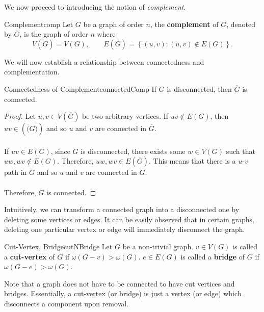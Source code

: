 \documentclass[math]{amznotes}
\theoremstyle{remark}
\begin{document}
We now proceed to introducing the notion of \textit{complement}.
\begin{dfnbox}{Complement}{comp}
    Let $G$ be a graph of order $n$, the {\color{red} \textbf{complement}} of $G$, denoted by $\overline{G}$, is the graph of order $n$ where
    \begin{equation*}
        V\left(\overline{G}\right) = V(G), \qquad E\left(\overline{G}\right) = \left\{(u, v) \colon (u, v) \notin E(G)\right\}.
    \end{equation*}
\end{dfnbox}
We will now establish a relationship between connectedness and complementation.
\begin{thmbox}{Connectedness of Complement}{connectedComp}
    If $G$ is disconnected, then $\overline{G}$ is connected.
    \tcblower
    \begin{proof}
        Let $u, v \in V\left(\overline{G}\right)$ be two arbitrary vertices. If $uv \notin E(G)$, then $uv \in \left(\overline(G)\right)$ and so $u$ and $v$ are connected in $\overline{G}$.
        \\\\
        If $uv \in E(G)$, since $G$ is disconnected, there exists some $w \in V(G)$ such that $uw, wv \notin E(G)$. Therefore, $uw, wv \in E\left(\overline{G}\right)$. This means that there is a $u$-$v$ path in $\overline{G}$ and so $u$ and $v$ are connected in $\overline{G}$.
        \\\\
        Therefore, $\overline{G}$ is connected.
    \end{proof}
\end{thmbox}
Intuitively, we can transform a connected graph into a disconnected one by deleting some vertices or edges. It can be easily observed that in certain graphs, deleting one particular vertex or edge will immediately disconnect the graph.
\begin{dfnbox}{Cut-Vertex, Bridge}{cutNBridge}
    Let $G$ be a non-trivial graph. $v \in V(G)$ is called a {\color{red} \textbf{cut-vertex}} of $G$ if $\omega(G - v) > \omega(G)$. $e \in E(G)$ is called a {\color{red} \textbf{bridge}} of $G$ if $\omega(G - e) > \omega(G)$.
\end{dfnbox}
Note that a graph does not have to be connected to have cut vertices and bridges. Essentially, a cut-vertex (or bridge) is just a vertex (or edge) which disconnects a component upon removal.
\end{document}
